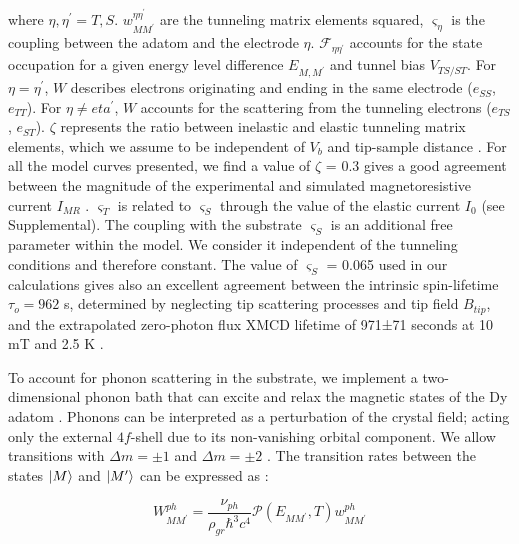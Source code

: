 \documentclass[
reprint,amsmath,amssymb,aps]{revtex4-2}
\begin{document}
where $\eta,\eta^{\prime}=T,S$. $w_{MM^{\prime}}^{\eta \eta^{\prime}} $ are the tunneling matrix elements squared, $\varsigma_{\eta}$ is the coupling between the adatom and the electrode $\eta$. $\mathcal{F}_{\eta\eta^{\prime}}$ accounts for the state occupation for a given energy level difference $ E_{M,M^{\prime}}$ and tunnel bias $V_{TS/ST}$. For $\eta=\eta^{\prime}$, $W$ describes electrons originating and ending in the same electrode ($e_{SS}$, $e_{TT}$). For $\eta \neq eta^{\prime}$, $W$ accounts for the scattering from the tunneling electrons ($e_{TS}$, $e_{ST}$). $\zeta$ represents the ratio between inelastic and elastic tunneling matrix elements, which we assume to be independent of $V_b$ and tip-sample distance \cite{fern2009,paul_ControlMillisecondSpin_2017,lorenteEfficientSpinTransitions2009,nussinovNoiseSpectroscopySingle2003}. For all the model curves presented, we find a value of $\zeta$ = 0.3 gives a good agreement between the magnitude of the experimental and simulated magnetoresistive current $I_{MR}$ \cite{delgadoSpinTransferTorqueSingle2010,delgado2010}.
$\varsigma_T$ is related to $\varsigma_S$ through the value of the elastic current $I_0$ (see Supplemental). The coupling with the substrate $\varsigma_S$ is an additional free parameter within the model. We consider it independent of the tunneling conditions and therefore constant. The value of $\varsigma_S$ = 0.065 used in our calculations gives also an excellent agreement between the intrinsic spin-lifetime $\tau_o=962$ s, determined by neglecting tip scattering processes and tip field $B_{tip}$, and the extrapolated zero-photon flux XMCD lifetime of 971±71 seconds at 10 mT and 2.5 K \citep{baltic2016}.

To account for phonon scattering in the substrate, we implement a two-dimensional phonon bath that can excite and relax the magnetic states of the Dy adatom \cite{cervetti2016,politi_tunneling_1995}. Phonons can be interpreted as a perturbation of the crystal field; acting only the external $4f$-shell due to its non-vanishing orbital component. We allow transitions with $\Delta m = \pm 1$ and $\Delta m = \pm 2$ \citep{cervetti2016}. The transition rates between the states $\ket{M}$ and $\ket{M^{\prime}}$ can be expressed as \cite{politi_tunneling_1995, cervetti2016,Leuenberger2000}:

\begin{equation}
    \label{eq:phonon_rates}
    W_{MM^{\prime}}^{ph}=\dfrac{\nu_{ph}}{\rho_{gr} \hbar^3 c^4} \mathcal{P} \left( E_{MM^{\prime}}, T \right) w^{ph}_{MM^{\prime}}
\end{equation}
\end{document}

